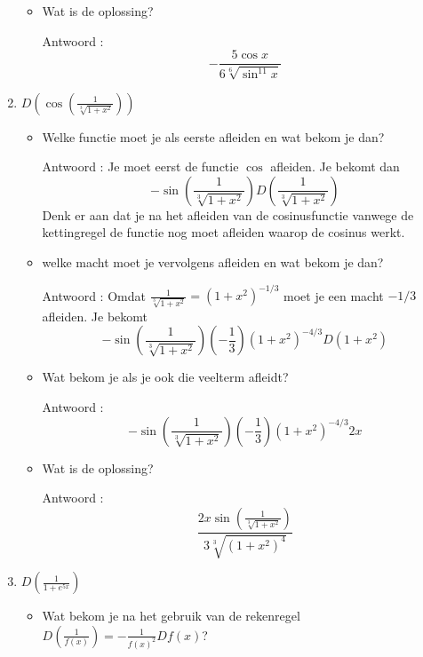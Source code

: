 \begin{enumerate}
\begin{itemize}
		\item Wat is de oplossing?
		
		Antwoord : \[-\frac{5 \cos x}{6 \sqrt[6]{\sin ^{11}x}}\]
		
	\end{itemize}
	
	\item $D \left( \cos \left( \frac {1}{\sqrt[3]{1+x^2}}  \right)  \right)$
	
	\begin{itemize}
		
		\item Welke functie moet je als eerste afleiden en wat bekom je dan?
		
		Antwoord : Je moet eerst de functie $\cos$ afleiden. Je bekomt dan
		\[
		-\sin \left(  \frac{1}{\sqrt[3]{1+x^2}} \right) D \left(  \frac{1}{\sqrt[3]{1+x^2}} \right) 
		\]
		Denk er aan dat je na het afleiden van de cosinusfunctie vanwege de kettingregel de functie nog moet afleiden waarop de cosinus werkt.
		
		\item welke macht moet je vervolgens afleiden en wat bekom je dan?
		
		Antwoord : Omdat $\frac{1}{\sqrt[3]{1+x^2}}=\left( 1+x^2  \right)^{-1/3}$ moet je een macht $-1/3$ afleiden. Je bekomt
		\[
		-\sin \left(  \frac{1}{\sqrt[3]{1+x^2}} \right) \left( -\frac{1}{3}  \right) \left( 1+x^2  \right)^{-4/3}D\left( 1+x^2  \right)
		\]
		
		\item Wat bekom je als je ook die veelterm afleidt?
		
		Antwoord : \[-\sin \left(  \frac{1}{\sqrt[3]{1+x^2}} \right) \left( -\frac{1}{3}  \right) \left( 1+x^2  \right)^{-4/3}2x\]
		
		\item Wat is de oplossing?
		
		Antwoord : \[\frac {2x\sin \left( \frac {1}{\sqrt[3]{1+x^2}} \right)}{3 \sqrt[3]{\left( 1+x^2  \right) ^4}}\]
		
	\end{itemize}
	
	\item $D \left( \frac {1}{1+e^{5x}} \right)$
	
	\begin{itemize}
		
		\item Wat bekom je na het gebruik van de rekenregel $D \left( \frac{1}{f(x)} \right)=-\frac {1}{f(x)^2}Df(x)$?
		

\end{itemize}
\end{enumerate}
